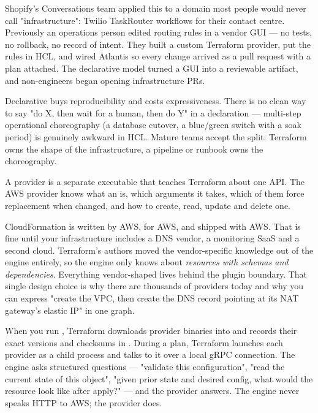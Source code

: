  Shopify's Conversations team applied this to a domain most people would never call "infrastructure": Twilio TaskRouter workflows for their contact centre. Previously an operations person edited routing rules in a vendor GUI --- no tests, no rollback, no record of intent. They built a custom Terraform provider, put the rules in HCL, and wired Atlantis so every change arrived as a pull request with a plan attached. The declarative model turned a GUI into a reviewable artifact, and non-engineers began opening infrastructure PRs.

\begin{tradeoff}
Declarative buys reproducibility and costs expressiveness. There is no clean way to say "do X, then wait for a human, then do Y" in a declaration --- multi-step operational choreography (a database cutover, a blue/green switch with a soak period) is genuinely awkward in HCL. Mature teams accept the split: Terraform owns the shape of the infrastructure, a pipeline or runbook owns the choreography.
\end{tradeoff}


 A provider is a separate executable that teaches Terraform about one API. The AWS provider knows what an  is, which arguments it takes, which of them force replacement when changed, and how to create, read, update and delete one.

 CloudFormation is written by AWS, for AWS, and shipped with AWS. That is fine until your infrastructure includes a DNS vendor, a monitoring SaaS and a second cloud. Terraform's authors moved the vendor-specific knowledge out of the engine entirely, so the engine only knows about \emph{resources with schemas and dependencies}. Everything vendor-shaped lives behind the plugin boundary. That single design choice is why there are thousands of providers today and why you can express "create the VPC, then create the DNS record pointing at its NAT gateway's elastic IP" in one graph.

 When you run , Terraform downloads provider binaries into  and records their exact versions and checksums in . During a plan, Terraform launches each provider as a child process and talks to it over a local gRPC connection. The engine asks structured questions --- "validate this configuration", "read the current state of this object", "given prior state and desired config, what would the resource look like after apply?" --- and the provider answers. The engine never speaks HTTP to AWS; the provider does.

